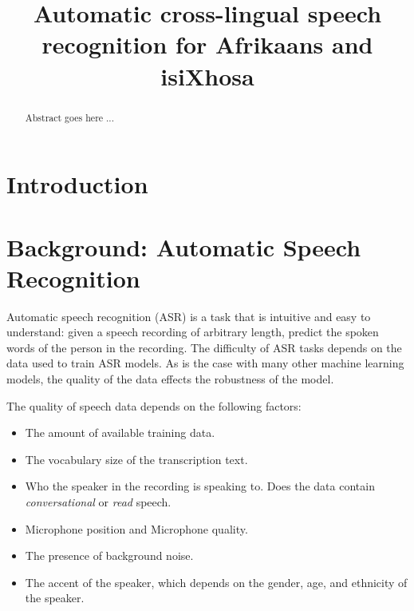\documentclass[conference]{IEEEtran}
\begin{document}
\title{Automatic cross-lingual speech recognition for Afrikaans and isiXhosa}
\author{
}
\maketitle



\begin{abstract}
    Abstract goes here ...
\end{abstract}



\section{Introduction}\label{sec:introduction}



\section{Background: Automatic Speech Recognition}\label{sec:background}
Automatic speech recognition (ASR) is a task that is intuitive and easy to understand: given a speech
recording of arbitrary length, predict the spoken words of the person in the recording. The difficulty
of ASR tasks depends on the data used to train ASR models. As is the case with many other machine learning models,
the quality of the data effects the robustness of the model.

The quality of speech data depends on the following factors:
\begin{itemize}
    \item The amount of available training data.
    \item The vocabulary size of the transcription text.
    \item Who the speaker in the recording is speaking to. Does the data contain \emph{conversational} or \emph{read} speech.
    \item Microphone position and Microphone quality.
    \item The presence of background noise.
    \item The accent of the speaker, which depends on the gender, age, and ethnicity of the speaker.
\end{itemize}
\end{document}
